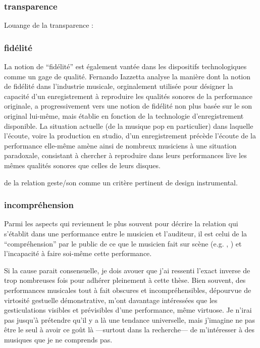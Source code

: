 \subsubsection{transparence}

Louange de la transparence : \cite{fels_mapping_2002} 

\cite{dobrian_e_2006}



\subsubsection{fidélité}

La notion de ``fidélité'' est également vantée dans les dispositifs technologiques comme un gage de qualité. Fernando Iazzetta \cite{iazzetta_meaning_2000} analyse la manière dont la notion de fidélité dans l'industrie musicale, orginalement utilisée pour désigner la capacité d'un enregistrement à reproduire les qualités sonores de la performance originale, a progressivement vers une notion de fidélité non plus basée sur le son original lui-même, mais établie en fonction de la technologie d'enregistrement disponible. La situation actuelle (de la musique pop en particulier) dans laquelle l'écoute, voire la production en studio, d'un enregistrement précède l'écoute de la performance elle-même amène ainsi de nombreux musiciens à une situation paradoxale, consistant à chercher à reproduire dans leurs performances live les mêmes qualités sonores que celles de leurs disques.


de la relation geste/son comme un critère pertinent de design instrumental.


\subsubsection{incompréhension}
Parmi les aspects qui reviennent le plus souvent pour décrire la relation qui s'établit dans une performance entre le musicien et l'auditeur, il est celui de la ``compréhension'' par le public de ce que le musicien fait sur scène (e.g. \cite{schloss_using_2003}, \cite{fels_mapping_2002}) et l'incapacité à faire soi-même cette performance.

Si la cause parait consensuelle, je dois avouer que j'ai ressenti l'exact inverse de trop nombreuses fois pour adhérer pleinement à cette thèse. Bien souvent, des performances musicales tout à fait obscures et incompréhensibles, dépourvue de virtosité gestuelle démonstrative, m'ont davantage intéressées que les gesticulations visibles et prévisibles d'une performance, même virtuose. Je n'irai pas jusqu'à prétendre qu'il y a là une tendance universelle, mais j'imagine ne pas être le seul à avoir ce goût là —surtout dans la recherche— de m'intéresser à des musiques que je ne comprends pas.



